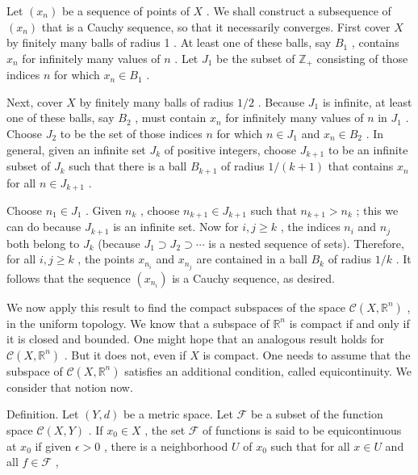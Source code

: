 \documentclass[10pt]{article}
\begin{document}
Let \(\left( {x}_{n}\right)\) be a sequence of points of \(X\) . We shall construct a subsequence of \(\left( {x}_{n}\right)\) that is a Cauchy sequence, so that it necessarily converges. First cover \(X\) by finitely many balls of radius 1 . At least one of these balls, say \({B}_{1}\) , contains \({x}_{n}\) for infinitely many values of \(n\) . Let \({J}_{1}\) be the subset of \({\mathbb{Z}}_{ + }\) consisting of those indices \(n\) for which \({x}_{n} \in  {B}_{1}\) .

Next, cover \(X\) by finitely many balls of radius \(1/2\) . Because \({J}_{1}\) is infinite, at least one of these balls, say \({B}_{2}\) , must contain \({x}_{n}\) for infinitely many values of \(n\) in \({J}_{1}\) . Choose \({J}_{2}\) to be the set of those indices \(n\) for which \(n \in  {J}_{1}\) and \({x}_{n} \in  {B}_{2}\) . In general, given an infinite set \({J}_{k}\) of positive integers, choose \({J}_{k + 1}\) to be an infinite subset of \({J}_{k}\) such that there is a ball \({B}_{k + 1}\) of radius \(1/\left( {k + 1}\right)\) that contains \({x}_{n}\) for all \(n \in  {J}_{k + 1}\) .

Choose \({n}_{1} \in  {J}_{1}\) . Given \({n}_{k}\) , choose \({n}_{k + 1} \in  {J}_{k + 1}\) such that \({n}_{k + 1} > {n}_{k}\) ; this we can do because \({J}_{k + 1}\) is an infinite set. Now for \(i,j \geq  k\) , the indices \({n}_{i}\) and \({n}_{j}\) both belong to \({J}_{k}\) (because \({J}_{1} \supset  {J}_{2} \supset  \cdots\) is a nested sequence of sets). Therefore, for all \(i,j \geq  k\) , the points \({x}_{{n}_{i}}\) and \({x}_{{n}_{j}}\) are contained in a ball \({B}_{k}\) of radius \(1/k\) . It follows that the sequence \(\left( {x}_{{n}_{i}}\right)\) is a Cauchy sequence, as desired.

We now apply this result to find the compact subspaces of the space \(\mathcal{C}\left( {X,{\mathbb{R}}^{n}}\right)\) , in the uniform topology. We know that a subspace of \({\mathbb{R}}^{n}\) is compact if and only if it is closed and bounded. One might hope that an analogous result holds for \(\mathcal{C}\left( {X,{\mathbb{R}}^{n}}\right)\) . But it does not, even if \(X\) is compact. One needs to assume that the subspace of \(\mathcal{C}\left( {X,{\mathbb{R}}^{n}}\right)\) satisfies an additional condition, called equicontinuity. We consider that notion now.

Definition. Let \(\left( {Y,d}\right)\) be a metric space. Let \(\mathcal{F}\) be a subset of the function space \(\mathcal{C}\left( {X,Y}\right)\) . If \({x}_{0} \in  X\) , the set \(\mathcal{F}\) of functions is said to be equicontinuous at \({x}_{0}\) if given \(\epsilon  > 0\) , there is a neighborhood \(U\) of \({x}_{0}\) such that for all \(x \in  U\) and all \(f \in  \mathcal{F}\) ,
\end{document}

